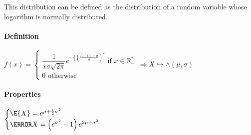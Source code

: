This distribution can be defined as the distribution of a random variable
whose logarithm is normally distributed.
\paragraph{Definition}
\begin{center}
$f(x)=\begin{cases}\dfrac{1}{x\sigma\sqrt{2\pi}}e^{-\frac{1}{2}\left( \frac{ln(x)-\mu}{\sigma}\right)^{2}}\text{ if }x\in\mathbb{R}_{+}^{*}\\0\text{ otherwise}\end{cases}\Rightarrow X\hookrightarrow \wedge(\mu,\sigma)$
\end{center}
\paragraph{Properties}
\begin{center}
	$\begin{cases}\E{X}=e^{\mu+\frac{1}{2}\sigma^{2}}\\\V{X}=\left( e^{\sigma^{2}}-1 \right)e^{2\mu+\sigma^{2}}\end{cases}$
\end{center}
